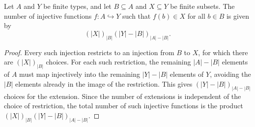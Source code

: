 \begin{lemma}
Let $A$ and $Y$ be finite types, and let $B \subseteq A$ and $X \subseteq Y$ be finite subsets.
The number of injective functions $f : A \hookrightarrow Y$ such that $f(b) \in X$ for all $b \in B$ is given by
\[
(|X|)_{|B|} (|Y| - |B|)_{|A| - |B|}.
\]
\end{lemma}
\begin{proof}
Every such injection restricts to an injection from $B$ to $X$, for which there are $(|X|)_{|B|}$ choices.
For each such restriction, the remaining $|A| - |B|$ elements of $A$ must map injectively into the remaining $|Y| - |B|$ elements of $Y$, avoiding the $|B|$ elements already in the image of the restriction.
This gives $(|Y| - |B|)_{|A| - |B|}$ choices for the extension.
Since the number of extensions is independent of the choice of restriction, the total number of such injective functions is the product $(|X|)_{|B|} (|Y| - |B|)_{|A| - |B|}$.
\end{proof}
